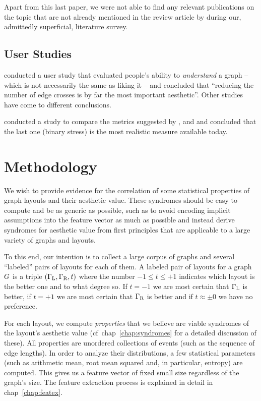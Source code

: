 \documentclass{graphstudy}
\begin{document}
Apart from this last paper, we were not able to find any relevant publications on the topic that are not already
mentioned in the review article by \citeauthor*{Raissa2015} during our, admittedly superficial, literature survey.

\section{User Studies}

\textcite{Purchase1997} conducted a user study that evaluated people's ability to \emph{understand} a graph -- which is
not necessarily the same as liking it -- and concluded that \enquote{reducing the number of edge crosses is by far the
  most important aesthetic}.  Other studies~\cite{Ware2002} have come to different conclusions.

\textcite{Welch2017} conducted a study to compare the metrics suggested by \citeauthor*{Purchase2002},
\citeauthor*{Klapaukh2014} and \citeauthor*{Koren2008} and concluded that the last one (binary stress) is the most
realistic measure available today.

\chapter{Methodology}
\label{chap:method}

We wish to provide evidence for the correlation of some statistical properties of graph layouts and their aesthetic
value.  These syndromes should be easy to compute and be as generic as possible, such as to avoid encoding implicit
assumptions into the feature vector as much as possible and instead derive syndromes for aesthetic value from first
principles that are applicable to a large variety of graphs and layouts.

To this end, our intention is to collect a large corpus of graphs and several \enquote{labeled} pairs of layouts for
each of them.  A labeled pair of layouts for a graph \(G\) is a triple
\((\Gamma_\mathrm{L},\Gamma_\mathrm{R},t)\) where the number \(-1\leq{t}\leq+1\) indicates which layout is the better
one and to what degree so.  If \(t=-1\) we are most certain that \(\Gamma_\mathrm{L}\) is better, if \(t=+1\) we are
most certain that \(\Gamma_\mathrm{R}\) is better and if \(t\approx\pm0\) we have no preference.

For each layout, we compute \emph{properties} that we believe are viable syndromes of the layout's aesthetic value
(\acs{cf}~\acs{chap}~\ref{chap:syndromes} for a detailed discussion of these).  All properties are unordered
collections of events (such as the sequence of edge lengths).  In order to analyze their distributions, a few
statistical parameters (such as arithmetic mean, root mean squared and, in particular, entropy) are computed.  This
gives us a feature vector of fixed small size regardless of the graph's size.  The feature extraction process is
explained in detail in \acl{chap}~\ref{chap:featex}.
\end{document}

